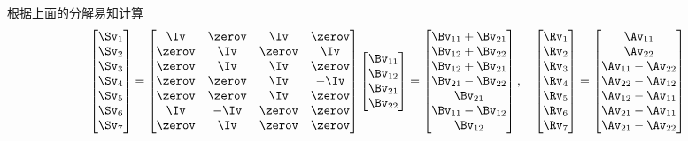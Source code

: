 \documentclass{ctexart}
\begin{document}
根据上面的分解易知计算
\begin{align*}
    \begin{bmatrix}
        \Sv_1 \\ \Sv_2 \\ \Sv_3 \\ \Sv_4 \\ \Sv_5 \\ \Sv_6 \\ \Sv_7
    \end{bmatrix} =
    \begin{bmatrix}
        \Iv    & \zerov & \Iv    & \zerov \\
        \zerov & \Iv    & \zerov & \Iv    \\
        \zerov & \Iv    & \Iv    & \zerov \\
        \zerov & \zerov & \Iv    & -\Iv   \\
        \zerov & \zerov & \Iv    & \zerov \\
        \Iv    & -\Iv   & \zerov & \zerov \\
        \zerov & \Iv    & \zerov & \zerov
    \end{bmatrix}
    \begin{bmatrix}
        \Bv_{11} \\ \Bv_{12} \\ \Bv_{21} \\ \Bv_{22}
    \end{bmatrix} =
    \begin{bmatrix}
        \Bv_{11} + \Bv_{21} \\ \Bv_{12} + \Bv_{22} \\ \Bv_{12} + \Bv_{21} \\ \Bv_{21} - \Bv_{22} \\ \Bv_{21} \\ \Bv_{11} - \Bv_{12} \\ \Bv_{12}
    \end{bmatrix}, \quad
    \begin{bmatrix}
        \Rv_1 \\ \Rv_2 \\ \Rv_3 \\ \Rv_4 \\ \Rv_5 \\ \Rv_6 \\ \Rv_7
    \end{bmatrix} =
    \begin{bmatrix}
        \Av_{11} \\ \Av_{22} \\ \Av_{11} - \Av_{22} \\ \Av_{22} - \Av_{12} \\ \Av_{12} - \Av_{11} \\ \Av_{21} - \Av_{11} \\ \Av_{21} - \Av_{22}
    \end{bmatrix}
\end{align*}
\end{document}
